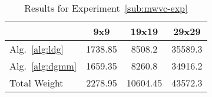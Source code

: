 \begin{table}
  \caption{Results for Experiment~\ref{sub:mwvc-exp}}
  \begin{center}
  \begin{tabular}{|l|c|c|c|}
    \hline
    &9x9&19x19&29x29\\\hline \hline
    Alg.~\ref{alg:ldg}&1738.85&8508.2&35589.3\\
    \hline
    Alg.~\ref{alg:dgmm}&1659.35&8260.8&34916.2\\
    \hline
    Total Weight&2278.95&10604.45&43572.3\\
    \hline
  \end{tabular}
  \end{center}
  \label{tab:exp1r}
\end{table}